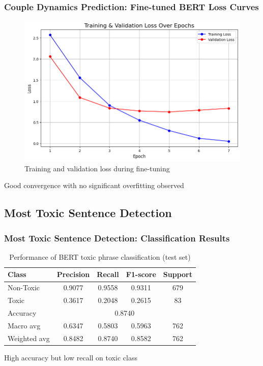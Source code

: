 \documentclass[aspectratio=169,xcolor=dvipsnames]{beamer}
\begin{document}
\begin{frame}
\frametitle{Couple Dynamics Prediction: Fine-tuned BERT Loss Curves}

\begin{figure}
\centering
\includegraphics[width=0.6\linewidth]{figures/bert_finetuned_loss_curves.png}
\caption{Training and validation loss during fine-tuning}
\end{figure}

\vspace{0.1cm}
\begin{center}
\colorbox{green!10}{\parbox{0.8\linewidth}{\centering Good convergence with no significant overfitting observed}}
\end{center}

\end{frame}

\subsection{Most Toxic Sentence Detection}

\begin{frame}
\frametitle{Most Toxic Sentence Detection: Classification Results}

\begin{table}
\centering
\begin{tabular}{lcccc}
\toprule
\textbf{Class} & \textbf{Precision} & \textbf{Recall} & \textbf{F1-score} & \textbf{Support} \\
\midrule
Non-Toxic & 0.9077 & 0.9558 & 0.9311 & 679 \\
Toxic & 0.3617 & 0.2048 & 0.2615 & 83 \\
\midrule
Accuracy & \multicolumn{4}{c}{0.8740} \\
Macro avg & 0.6347 & 0.5803 & 0.5963 & 762 \\
Weighted avg & 0.8482 & 0.8740 & 0.8582 & 762 \\
\bottomrule
\end{tabular}
\caption{Performance of BERT toxic phrase classification (test set)}
\end{table}

\vspace{0.2cm}
\begin{center}
\colorbox{blue!10}{\parbox{0.75\linewidth}{\centering High accuracy but low recall on toxic class}}
\end{center}

\end{frame}
\end{document}
